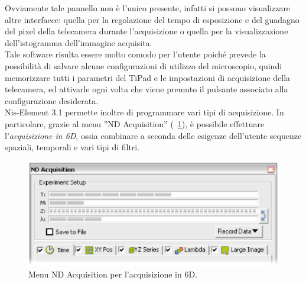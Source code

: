 Ovviamente tale pannello non è l'unico presente, infatti si possono visualizzare altre interfacce: quella per la regolazione del tempo di esposizione e del guadagno del pixel della telecamera durante l'acquisizione o quella per la visualizzazione dell'istogramma dell'immagine acquisita.\\
Tale software risulta essere molto comodo per l'utente poiché prevede la possibilità di salvare alcune configurazioni di utilizzo del microscopio, quindi memorizzare tutti i parametri del TiPad e le impostazioni di acquisizione della telecamera, ed attivarle ogni volta che viene premuto il pulsante associato alla configurazione desiderata. \\
Nis-Element 3.1 permette inoltre di programmare vari tipi di acquisizione. In particolare, grazie al menu ''ND Acquisition'' (\figurename~\ref{fig:6D}), è possibile effettuare l'\textit{acquisizione in 6D}, ossia combinare a seconda delle esigenze dell'utente sequenze spaziali, temporali e vari tipi di filtri. 

\begin{figure}[!ht]
 \centering
 \includegraphics[scale=.60]{img/CAP26D.png}
 \caption{\small{Menu ND Acquisition per l'acquisizione in 6D.}}
 \label{fig:6D}
\end{figure}

